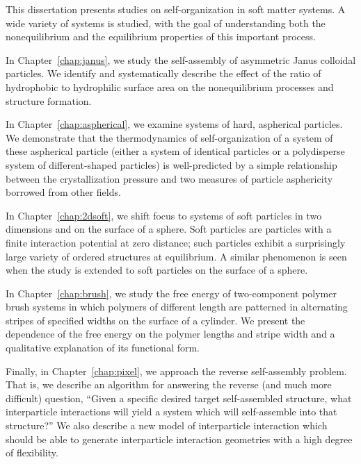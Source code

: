 This dissertation presents studies on self-organization in soft matter systems.
A wide variety of systems is studied, with the goal of understanding both the nonequilibrium and the equilibrium properties of this important process.

In Chapter~\ref{chap:janus}, we study the self-assembly of asymmetric Janus colloidal particles.
We identify and systematically describe the effect of the ratio of hydrophobic to hydrophilic surface area on the nonequilibrium processes and structure formation.

In Chapter~\ref{chap:aspherical}, we examine systems of hard, aspherical particles.
We demonstrate that the thermodynamics of self-organization of a system of these aspherical particle (either a system of identical particles or a polydisperse system of different-shaped particles) is well-predicted by a simple relationship between the crystallization pressure and two measures of particle asphericity borrowed from other fields.

In Chapter~\ref{chap:2dsoft}, we shift focus to systems of soft particles in two dimensions and on the surface of a sphere.
Soft particles are particles with a finite interaction potential at zero distance; such particles exhibit a surprisingly large variety of ordered structures at equilibrium.
A similar phenomenon is seen when the study is extended to soft particles on the surface of a sphere.

In Chapter~\ref{chap:brush}, we study the free energy of two-component polymer brush systems in which polymers of different length are patterned in alternating stripes of specified widths on the surface of a cylinder.
We present the dependence of the free energy on the polymer lengths and stripe width and a qualitative explanation of its functional form.

Finally, in Chapter~\ref{chap:pixel}, we approach the reverse self-assembly problem.
That is, we describe an algorithm for answering the reverse (and much more difficult) question, ``Given a specific desired target self-assembled structure, what interparticle interactions will yield a system which will self-assemble into that structure?''
We also describe a new model of interparticle interaction which should be able to generate interparticle interaction geometries with a high degree of flexibility.



